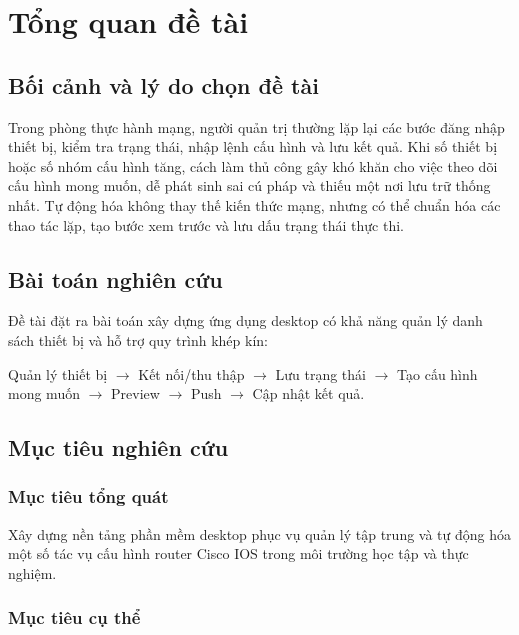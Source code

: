 \chapter{Tổng quan đề tài}
\label{chap:tong-quan}

\section{Bối cảnh và lý do chọn đề tài}

Trong phòng thực hành mạng, người quản trị thường lặp lại các bước đăng nhập thiết bị, kiểm tra trạng thái, nhập lệnh cấu hình và lưu kết quả. Khi số thiết bị hoặc số nhóm cấu hình tăng, cách làm thủ công gây khó khăn cho việc theo dõi cấu hình mong muốn, dễ phát sinh sai cú pháp và thiếu một nơi lưu trữ thống nhất. Tự động hóa không thay thế kiến thức mạng, nhưng có thể chuẩn hóa các thao tác lặp, tạo bước xem trước và lưu dấu trạng thái thực thi.

\section{Bài toán nghiên cứu}

Đề tài đặt ra bài toán xây dựng ứng dụng desktop có khả năng quản lý danh sách thiết bị và hỗ trợ quy trình khép kín:

\begin{center}
Quản lý thiết bị $\rightarrow$ Kết nối/thu thập $\rightarrow$ Lưu trạng thái $\rightarrow$ Tạo cấu hình mong muốn $\rightarrow$ Preview $\rightarrow$ Push $\rightarrow$ Cập nhật kết quả.
\end{center}

\section{Mục tiêu nghiên cứu}

\subsection{Mục tiêu tổng quát}

Xây dựng nền tảng phần mềm desktop phục vụ quản lý tập trung và tự động hóa một số tác vụ cấu hình router Cisco IOS trong môi trường học tập và thực nghiệm.

\subsection{Mục tiêu cụ thể}

